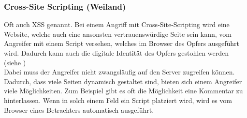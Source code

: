 \subsubsection{Cross-Site Scripting (Weiland)}
\label{sec:content_security_cross_site_scripting}
Oft auch XSS genannt. Bei einem Angriff mit Cross-Site-Scripting wird eine Website, welche auch eine ansonsten vertrauenswürdige Seite sein kann, vom Angreifer mit einem Script versehen, welches im Browser des Opfers ausgeführt wird. Dadurch kann auch die digitale Identität des Opfers gestohlen werden (siehe  )\\ %
Dabei muss der Angreifer nicht zwangsläufig auf den Server zugreifen können. Dadurch, dass viele Seiten dynamisch gestaltet sind, bieten sich einem Angreifer viele Möglichkeiten. Zum Beispiel gibt es oft die Möglichkeit eine Kommentar zu hinterlassen. Wenn in solch einem Feld ein Script platziert wird, wird es vom Browser eines Betrachters automatisch ausgeführt.
